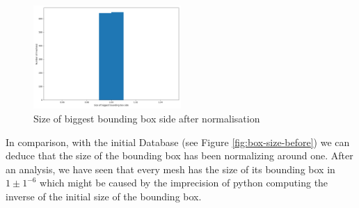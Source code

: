 \documentclass[10pt,twocolumn,letterpaper]{article}
\begin{document}
\begin{figure}[h!]
\begin{center}
  \includegraphics[width=0.5\textwidth]{picture/Normalised size of biggest bounding box side}
  \caption{Size of biggest bounding box side after normalisation}
  \label{fig:box-size-after}
  \end{center}
\end{figure}

In comparison, with the initial Database (see Figure \ref{fig:box-size-before}) we can deduce that the size of the bounding box has been normalizing around one. After an analysis, we have seen that every mesh has the size of its bounding box in $1\pm 1^{-6}$ which might be caused by the imprecision of python computing the inverse of the initial size of the bounding box.

\medskip
\printbibliography
\end{document}
